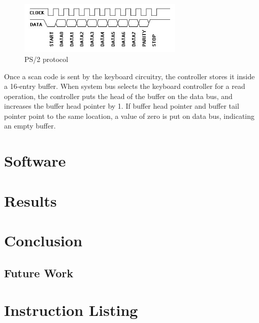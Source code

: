 \documentclass[oneside]{book}
\begin{document}
\begin{figure}[H]
\begin{center}
\includegraphics[width=0.7\textwidth]{ps2prot.png}
\end{center}
\caption{PS/2 protocol}
\label{ps2prot}
\end{figure}

Once a scan code is sent by the keyboard circuitry, the controller stores
it inside a 16-entry buffer. When system bus selects the keyboard controller
for a read operation, the controller puts the head of the buffer on
the data bus, and increases the buffer head pointer by 1. If buffer head
pointer and buffer tail pointer point to the same location, a value
of zero is put on data bus, indicating an empty buffer.


\chapter{Software}


\chapter{Results}


\chapter{Conclusion}

\section{Future Work}


\appendix

\chapter{Instruction Listing}


\end{document}
